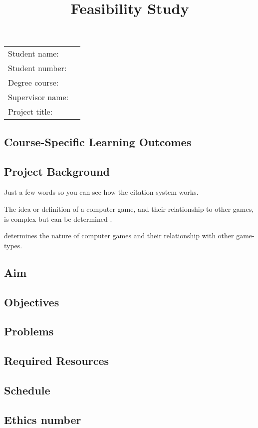 \documentclass[12pt]{article}
\title{Feasibility Study}
\date{}
\begin{document}
\maketitle
\Large
\begin{tabular}{ll}
Student name: & \\
Student number: & \\
Degree course: & \\
Supervisor name: & \\
Project title: & \\	
\end{tabular}

\small
\subsection*{Course-Specific Learning Outcomes}

\subsection*{Project Background}
	
	Just a few words so you can see how the citation system works.
	
	The idea or definition of a computer game, and their relationship to other games, is complex but can be determined \autocite{juul-2003}.
	
	\textcite{juul-2003} determines the nature of computer games and their relationship with other game-types. 
	
	
\subsection*{Aim}
\subsection*{Objectives}
\subsection*{Problems}
\subsection*{Required Resources}
\subsection*{Schedule}
\subsection*{Ethics number}
	








\printbibliography
\end{document}
